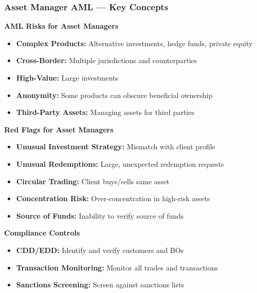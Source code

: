 \documentclass[12pt,aspectratio=169]{beamer}
\renewcommand{\scriptsize}{\fontsize{4.5}{5.5}\selectfont}
\begin{document}
	\begin{frame}
		\frametitle{\fontsize{11}{13}\selectfont \textbf{Asset Manager AML — Key Concepts}}
		\begin{block}{\fontsize{7}{9}\selectfont \textbf{AML Risks for Asset Managers}}
			\scriptsize
			\begin{itemize}
				\item \textbf{Complex Products:} Alternative investments, hedge funds, private equity
				\item \textbf{Cross-Border:} Multiple jurisdictions and counterparties
				\item \textbf{High-Value:} Large investments
				\item \textbf{Anonymity:} Some products can obscure beneficial ownership
				\item \textbf{Third-Party Assets:} Managing assets for third parties
			\end{itemize}
		\end{block}
		\vspace{0.02cm}
		\begin{block}{\fontsize{7}{9}\selectfont \textbf{Red Flags for Asset Managers}}
			\scriptsize
			\begin{itemize}
				\item \textbf{Unusual Investment Strategy:} Mismatch with client profile
				\item \textbf{Unusual Redemptions:} Large, unexpected redemption requests
				\item \textbf{Circular Trading:} Client buys/sells same asset
				\item \textbf{Concentration Risk:} Over-concentration in high-risk assets
				\item \textbf{Source of Funds:} Inability to verify source of funds
			\end{itemize}
		\end{block}
		\vspace{0.02cm}
		\begin{block}{\fontsize{7}{9}\selectfont \textbf{Compliance Controls}}
			\scriptsize
			\begin{itemize}
				\item \textbf{CDD/EDD:} Identify and verify customers and BOs
				\item \textbf{Transaction Monitoring:} Monitor all trades and transactions
				\item \textbf{Sanctions Screening:} Screen against sanctions lists

\end{itemize}
\end{block}
\end{frame}
\end{document}
